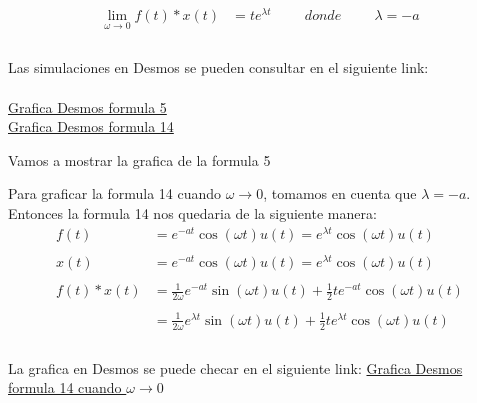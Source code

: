 \documentclass[10pt]{article}
\begin{document}
\begin{equation*} 
\begin{split}
\lim_{\omega\to 0} f(t)*x(t) & = te^{\lambda t} \hspace{1cm} donde \hspace{1cm}\lambda = -a\\ \\
\end{split}
\end{equation*}

Las simulaciones en Desmos se pueden consultar en el siguiente link:\\\\
\href{https://www.desmos.com/calculator/tik6ny8ije}{Grafica Desmos formula 5} \\
\href{https://www.desmos.com/calculator/b7d99bmipt}{Grafica Desmos formula 14} \\

\newpage

Vamos a mostrar la grafica de la formula 5

\newpage

Para graficar la formula 14 cuando ${ \omega \to 0}$, tomamos en cuenta que $\lambda = -a$.\\ Entonces la formula 14 nos quedaria de la siguiente manera:\\

\begin{equation*} 
\begin{split}
f(t) & = e^{-at}\cos(\omega t)u(t)=e^{\lambda t}\cos(\omega t)u(t)\\ \\
x(t) & = e^{-at}\cos(\omega t)u(t)=e^{\lambda t}\cos(\omega t)u(t)\\ \\
f(t)*x(t) & = \frac{1}{2 \omega}e^{-at}\sin(\omega t)u(t) + \frac{1}{2}te^{-at}\cos(\omega t)u(t)\\ \\
& = \frac{1}{2 \omega}e^{\lambda t}\sin(\omega t)u(t) + \frac{1}{2}te^{\lambda t}\cos(\omega t)u(t) \\ \\
\end{split}
\end{equation*}

La grafica en Desmos se puede checar en el siguiente link:
\href{https://www.desmos.com/calculator/k6znc7yyph}{Grafica Desmos formula 14 cuando ${ \omega \to 0}$} \\

\clearpage
\newpage
\end{document}
